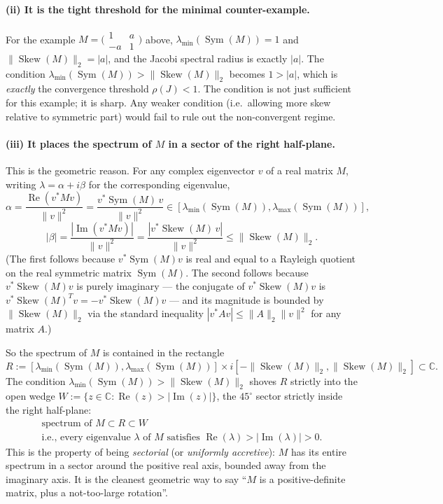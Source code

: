 \documentclass{article}
\newcommand{\Sym}{\operatorname{Sym}}
\newcommand{\Skew}{\operatorname{Skew}}
\begin{document}
\paragraph{(ii) It is the tight threshold for the minimal counter-example.}
For the example
$M = \bigl(\begin{smallmatrix} 1 & a \\ -a & 1 \end{smallmatrix}\bigr)$ above,
$\lambda_{\min}(\Sym(M)) = 1$ and $\|\Skew(M)\|_2 = |a|$, and the Jacobi
spectral radius is exactly $|a|$. The condition
$\lambda_{\min}(\Sym(M)) > \|\Skew(M)\|_2$ becomes $1 > |a|$, which is
\emph{exactly} the convergence threshold $\rho(J) < 1$. The condition is not
just sufficient for this example; it is sharp. Any weaker condition (i.e.\
allowing more skew relative to symmetric part) would fail to rule out the
non-convergent regime.

\paragraph{(iii) It places the spectrum of $M$ in a sector of the right half-plane.}
This is the geometric reason. For any complex eigenvector $v$ of a real matrix $M$,
writing $\lambda = \alpha + i\beta$ for the corresponding eigenvalue,
\[
    \alpha = \frac{\operatorname{Re}(v^* M v)}{\|v\|^2}
           = \frac{v^* \Sym(M)\, v}{\|v\|^2} \in [\lambda_{\min}(\Sym(M)), \lambda_{\max}(\Sym(M))],
\]
\[
    |\beta| = \frac{|\operatorname{Im}(v^* M v)|}{\|v\|^2}
            = \frac{|v^* \Skew(M)\, v|}{\|v\|^2} \leq \|\Skew(M)\|_2.
\]
(The first follows because $v^* \Sym(M) v$ is real and equal to a Rayleigh
quotient on the real symmetric matrix $\Sym(M)$. The second follows because
$v^* \Skew(M) v$ is purely imaginary --- the conjugate of $v^* \Skew(M) v$ is
$v^* \Skew(M)^T v = -v^* \Skew(M) v$ --- and its magnitude is bounded by
$\|\Skew(M)\|_2$ via the standard inequality
$|v^* A v| \leq \|A\|_2 \|v\|^2$ for any matrix $A$.)

So the spectrum of $M$ is contained in the rectangle
\[
    R := [\lambda_{\min}(\Sym(M)), \lambda_{\max}(\Sym(M))]
         \times i[-\|\Skew(M)\|_2, \|\Skew(M)\|_2] \subset \mathbb{C}.
\]
The condition $\lambda_{\min}(\Sym(M)) > \|\Skew(M)\|_2$ shoves $R$ strictly
into the open wedge $W := \{z \in \mathbb{C} : \operatorname{Re}(z) > |\operatorname{Im}(z)|\}$,
the $45^\circ$ sector strictly inside the right half-plane:
\[
    \begin{array}{c}
    \text{spectrum of } M \subset R \subset W \\[0.2em]
    \text{i.e., every eigenvalue } \lambda \text{ of } M
    \text{ satisfies } \operatorname{Re}(\lambda) > |\operatorname{Im}(\lambda)| > 0.
    \end{array}
\]
This is the property of being \emph{sectorial} (or \emph{uniformly accretive}):
$M$ has its entire spectrum in a sector around the positive real axis,
bounded away from the imaginary axis. It is the cleanest geometric way to
say ``$M$ is a positive-definite matrix, plus a not-too-large rotation''.
\end{document}
